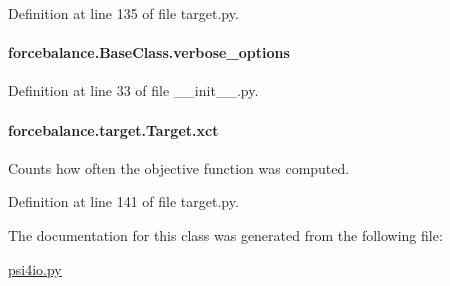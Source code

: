 Definition at line 135 of file target.\-py.

\hypertarget{classforcebalance_1_1BaseClass_afd68efa29ccd2f320f4cf82198214aac}{
\paragraph[{verbose\-\_\-options}]{\setlength{\rightskip}{0pt plus 5cm}forcebalance.\-Base\-Class.\-verbose\-\_\-options\hspace{0.3cm}{\ttfamily [inherited]}}}\label{classforcebalance_1_1BaseClass_afd68efa29ccd2f320f4cf82198214aac}


Definition at line 33 of file \-\_\-\-\_\-init\-\_\-\-\_\-.\-py.

\hypertarget{classforcebalance_1_1target_1_1Target_aad2e385cfbf7b4a68f1c2cb41133fe82}{
\paragraph[{xct}]{\setlength{\rightskip}{0pt plus 5cm}forcebalance.\-target.\-Target.\-xct\hspace{0.3cm}{\ttfamily [inherited]}}}\label{classforcebalance_1_1target_1_1Target_aad2e385cfbf7b4a68f1c2cb41133fe82}


Counts how often the objective function was computed. 



Definition at line 141 of file target.\-py.



The documentation for this class was generated from the following file\-:\begin{DoxyCompactItemize}
\item 
\hyperlink{psi4io_8py}{psi4io.\-py}\end{DoxyCompactItemize}
